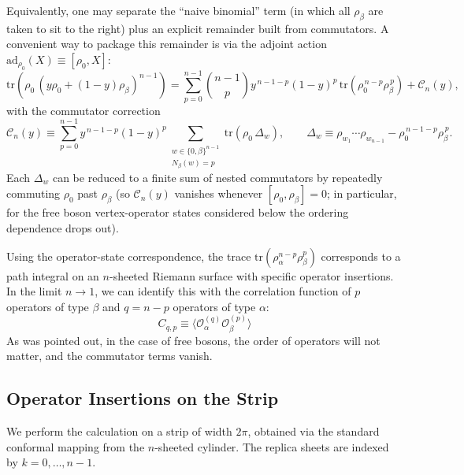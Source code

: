 \documentclass[11pt]{article}
\newcommand{\tr}{\mathrm{tr}}
\begin{document}
  Equivalently, one may separate the ``naive binomial'' term (in which all
  $\rho_{\beta}$ are taken to sit to the right) plus an explicit remainder built
  from commutators. A convenient way to package this remainder is via the
  adjoint action $\mathrm{ad}_{\rho_0}(X)\equiv[\rho_{0},X]$:
  \begin{equation}
    \label{eq:binomial-plus-comm-alpha0}\tr\!\left(\rho_{0}\,(y\rho_{0}+(1-y)\rho
    _{\beta})^{n-1}\right) = \sum_{p=0}^{n-1}\binom{n-1}{p}y^{\,n-1-p}(1-y)^{p}\,
    \tr\!\left(\rho_{0}^{\,n-p}\rho_{\beta}^{\,p}\right) +\mathcal{C}_{n}(y),
  \end{equation}
  with the commutator correction
  \begin{equation}
    \label{eq:Cn-def}\mathcal{C}_{n}(y) \equiv \sum_{p=0}^{n-1}y^{\,n-1-p}(1-y)^{p}
    \sum_{\substack{w\in\{0,\beta\}^{n-1}\\ N_\beta(w)=p}}\tr\!\left(\rho_{0}\,\Delta
    _{w}\right),\qquad \Delta_{w}\equiv \rho_{w_1}\cdots\rho_{w_{n-1}}-\rho_{0}^{\,n-1-p}
    \rho_{\beta}^{\,p}.
  \end{equation}
  Each $\Delta_{w}$ can be reduced to a finite sum of nested commutators by repeatedly
  commuting $\rho_{0}$ past $\rho_{\beta}$ (so $\mathcal{C}_{n}(y)$ vanishes
  whenever $[\rho_{0},\rho_{\beta}]=0$; in particular, for the free boson vertex-operator
  states considered below the ordering dependence drops out).

  Using the operator-state correspondence, the trace
  $\text{tr}(\rho_{\alpha}^{n-p}\rho_{\beta}^{p})$ corresponds to a path
  integral on an $n$-sheeted Riemann surface with specific operator insertions. In
  the limit $n \to 1$, we can identify this with the correlation function of $p$
  operators of type $\beta$ and $q=n-p$ operators of type $\alpha$:
  \begin{equation}
    \label{fullcorr}C_{q,p}\equiv \langle \mathcal{O}_{\alpha}^{(q)}\mathcal{O}_{\beta}
    ^{(p)}\rangle
  \end{equation}
  As was pointed out, in the case of free bosons, the order of operators will not
  matter, and the commutator terms vanish.

  \subsection*{Operator Insertions on the Strip}

  We perform the calculation on a strip of width $2\pi$, obtained via the
  standard conformal mapping from the $n$-sheeted cylinder. The replica sheets are
  indexed by $k = 0, \dots, n-1$.
\end{document}
